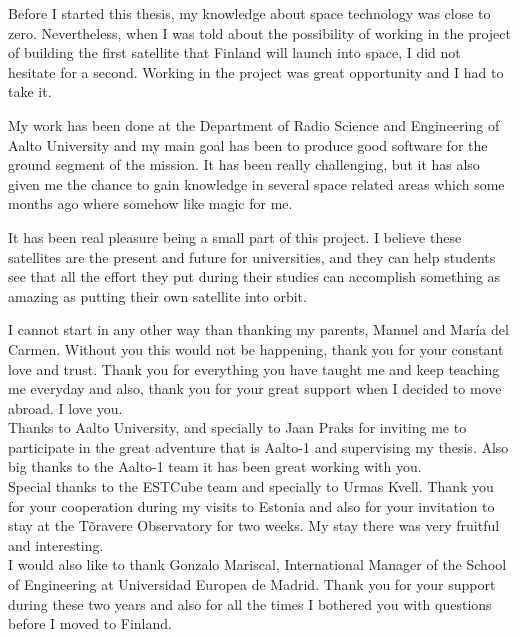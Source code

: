 
Before I started this thesis, my knowledge about space technology was close to zero. Nevertheless, when I was told about the possibility of working in the project of building the first satellite that Finland will launch into space, I did not hesitate for a second. Working in the project was great opportunity and I had to take it.

My work has been done at the Department of Radio Science and Engineering of Aalto University and my main goal has been to produce good software for the ground segment of the mission. It has been really challenging, but it has also given me the chance to gain knowledge in several space related areas which some months ago where somehow like magic for me.

It has been real pleasure being a small part of this project. I believe these satellites are the present and future for universities, and they can help students see that all the effort they put during their studies can accomplish something as amazing as putting their own satellite into orbit.


\thispagestyle{plain}
\pagebreak


I cannot start in any other way than thanking my parents, Manuel and María del Carmen. Without you this would not be happening, thank you for your constant love and trust. Thank you for everything you have taught me and keep teaching me everyday and also, thank you for your great support when I decided to move abroad. I love you.\\

Thanks to Aalto University, and specially to Jaan Praks for inviting me to participate in the great adventure that is Aalto-1 and supervising my thesis. Also big thanks to the Aalto-1 team it has been great working with you.\\

Special thanks to the ESTCube team and specially to Urmas Kvell. Thank you for your cooperation during my visits to Estonia and also for your invitation to stay at the Tõravere Observatory for two weeks. My stay there was very fruitful  and interesting.\\

I would also like to thank Gonzalo Mariscal, International Manager of the School of Engineering at Universidad Europea de Madrid. Thank you for your support during these two years and also for all the times I bothered you with questions before I moved to Finland.\\

